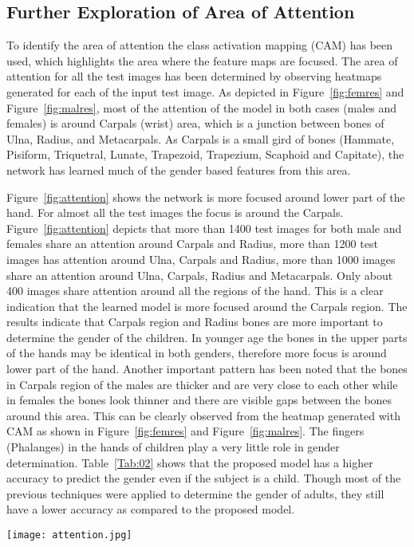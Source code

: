 \documentclass{bioinfo}
\begin{document}
\begin{methods}
\subsection{Further Exploration of Area of Attention}
To identify the area of attention the class activation mapping (CAM) has been used, which highlights the area where the feature maps are focused. The area of attention for all the test images has been determined by observing heatmaps generated for each of the input test image. As depicted in Figure~\ref{fig:femres} and Figure~\ref{fig:malres}, most of the attention of the model in both cases (males and females) is around Carpals (wrist) area, which is a junction between bones of Ulna, Radius, and Metacarpals.
As Carpals is a small gird of bones (Hammate, Pisiform, Triquetral, Lunate, Trapezoid, Trapezium, Scaphoid and Capitate), the network has learned much of the gender based features from this area.

Figure~\ref{fig:attention} shows the network is more focused around lower part of the hand. For almost all the test images the focus is around the Carpals. Figure~\ref{fig:attention} depicts that more than 1400 test images for both male and females share an attention around Carpals and Radius, more than 1200 test images has attention around Ulna, Carpals and Radius, more than 1000 images share an attention around Ulna, Carpals, Radius and Metacarpals. Only about 400 images share attention around all the regions of the hand.
This is a clear indication that the learned model is more focused around the Carpals region.
The results indicate that Carpals region and Radius bones are more important to determine the gender of the children. In younger age the bones in the upper parts of the hands may be identical in both genders, therefore more focus is around lower part of the hand. Another important pattern has been noted that the bones in Carpals region of the males are thicker and are very close to each other while in females the bones look thinner and there are visible gaps between the bones around this area. This can be clearly observed from the heatmap generated with CAM as shown in Figure~\ref{fig:femres} and Figure~\ref{fig:malres}. The fingers (Phalanges) in the hands of children play a very little role in gender determination.\vspace*{1pt}
Table~\ref{Tab:02} shows that the proposed model has a higher accuracy to predict the gender even if the subject is a child. Though most of the previous techniques were applied to determine the gender of adults, they still have a lower accuracy as compared to the proposed model.

\begin{figure*}[]%
\texttt{[image: attention.jpg]}
\caption{Area of attention for test dataset. It can be clearly seen that most of the attention is around carpals, ulna and radius for both the genders.}
\label{fig:attention}
\end{figure*}
\end{methods}
\end{document}
